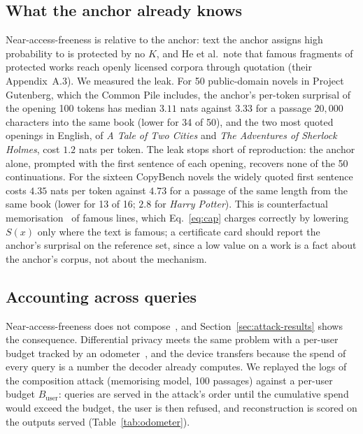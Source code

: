 \subsection{What the anchor already knows}\label{sec:leakage}
Near-access-freeness is relative to the anchor: text the anchor assigns high probability to is protected by no $K$, and He et al.\ note that famous fragments of protected works reach openly licensed corpora through quotation (their Appendix~A.3). We measured the leak. For 50 public-domain novels in Project Gutenberg, which the Common Pile includes, the anchor's per-token surprisal of the opening 100 tokens has median $3.11$ nats against $3.33$ for a passage $20{,}000$ characters into the same book (lower for 34 of 50), and the two most quoted openings in English, of \emph{A Tale of Two Cities} and \emph{The Adventures of Sherlock Holmes}, cost $1.2$ nats per token. The leak stops short of reproduction: the anchor alone, prompted with the first sentence of each opening, recovers none of the 50 continuations. For the sixteen CopyBench novels the widely quoted first sentence costs $4.35$ nats per token against $4.73$ for a passage of the same length from the same book (lower for 13 of 16; $2.8$ for \emph{Harry Potter}). This is counterfactual memorisation~\cite{zhang2023counterfactual} of famous lines, which Eq.~\eqref{eq:cap} charges correctly by lowering $S(x)$ only where the text is famous; a certificate card should report the anchor's surprisal on the reference set, since a low value on a work is a fact about the anchor's corpus, not about the mechanism.

\subsection{Accounting across queries}\label{sec:odometer}
Near-access-freeness does not compose~\cite{cohen2025blameless}, and Section~\ref{sec:attack-results} shows the consequence. Differential privacy meets the same problem with a per-user budget tracked by an odometer~\cite{rogers2016odometers,whitehouse2023fully}, and the device transfers because the spend of every query is a number the decoder already computes. We replayed the logs of the composition attack (memorising model, 100 passages) against a per-user budget $B_{\mathrm{user}}$: queries are served in the attack's order until the cumulative spend would exceed the budget, the user is then refused, and reconstruction is scored on the outputs served (Table~\ref{tab:odometer}).

